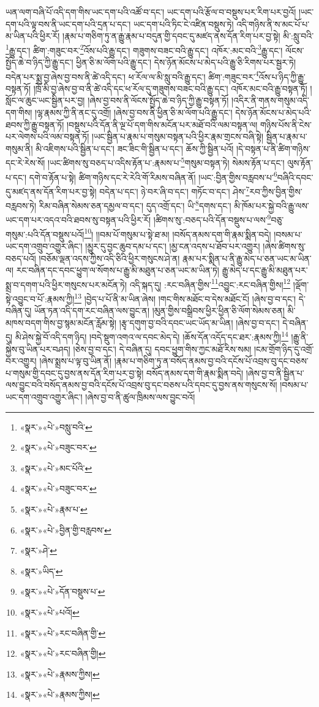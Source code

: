 ཡན་ལག་བཞི་པོ་འདི་དག་གིས་ཡང་དག་པའི་འཚོ་བ་དང་། ཡང་དག་པའི་རྩོལ་བ་བསྡུས་པར་རིག་པར་བྱའོ། །ཡང་དག་པའི་ལྟ་བས་ནི་ཡང་དག་པའི་དྲན་པ་དང་། ཡང་དག་པའི་ཏིང་ངེ་འཛིན་བསྡུས་ཏེ། འདི་གཉིས་ནི་ས་མང་པོ་པ་མ་ཡིན་པའི་ཕྱིར་རོ། །རྣམ་པ་གཅིག་ཏུ་ན་རྒྱུ་རྣམ་པ་བདུན་གྱི་དབང་དུ་མཛད་ནས་དོན་རིག་པར་བྱ་སྟེ། མི་:སླུ་བའི་\footnote{«སྣར་»«པེ་»བསླུ་བའི་}རྒྱུ་དང་། ཚིག་:གཟུང་བར་\footnote{«སྣར་»«པེ་»བཟུང་བར་}འོས་པའི་རྒྱུ་དང་། གཟུགས་བཟང་བའི་རྒྱུ་དང་། འཁོར་:མང་བའི་\footnote{«སྣར་»«པེ་»མང་པོའི་}རྒྱུ་དང་། ལོངས་སྤྱོད་ཆེ་བ་ཉིད་ཀྱི་རྒྱུ་དང་། ཕྱིན་ཅི་མ་ལོག་པའི་རྒྱུ་དང་། དེས་ཉོན་མོངས་པ་མེད་པའི་རྒྱུ་ཅི་རིགས་པར་སྦྱར་ཏེ། བདེན་པར་སྨྲ་བྱ་ཞེས་བྱ་བས་ནི་ཚེ་འདི་དང་། ཕ་རོལ་ལ་མི་སླུ་བའི་རྒྱུ་དང་། ཚིག་:གཟུང་བར་\footnote{«སྣར་»«པེ་»བཟུང་བར་}འོས་པ་ཉིད་ཀྱི་རྒྱུ་བསྟན་ཏོ། །ཁྲོ་མི་བྱ་ཞེས་བྱ་བ་ནི་ཚེ་འདི་དང་ཕ་རོལ་དུ་གཟུགས་བཟང་བའི་རྒྱུ་དང་། འཁོར་མང་བའི་རྒྱུ་བསྟན་ཏོ། །སློང་ལ་ཆུང་ཡང་སྦྱིན་པར་བྱ། །ཞེས་བྱ་བས་ནི་ལོངས་སྤྱོད་ཆེ་བ་ཉིད་ཀྱི་རྒྱུ་བསྟན་ཏོ། །འདིར་ནི་གནས་གསུམ་འདི་དག་གིས། །ལྷ་རྣམས་ཀྱི་ནི་ནང་དུ་འགྲོ། །ཞེས་བྱ་བས་ནི་ཕྱིན་ཅི་མ་ལོག་པའི་རྒྱུ་དང་། དེས་ཉོན་མོངས་པ་མེད་པའི་ཐབས་ཀྱི་རྒྱུ་བསྟན་ཏོ། །བསྡུས་པའི་དོན་ནི་ལྔ་པོ་དག་གིས་མངོན་པར་མཐོ་བའི་ལམ་བསྟན་ལ། གཉིས་པོས་ནི་ངེས་པར་ལེགས་པའི་ལམ་བསྟན་ཏོ། །ཡང་སྦྱིན་པ་རྣམ་པ་གསུམ་བསྟན་པའི་ཕྱིར་རྣམ་གྲངས་བཞི་སྟེ། སྦྱིན་པ་རྣམ་པ་གསུམ་ནི། མི་འཇིགས་པའི་སྦྱིན་པ་དང་། ཟང་ཟིང་གི་སྦྱིན་པ་དང་། ཆོས་ཀྱི་སྦྱིན་པའོ། །དེ་བསྟན་པ་ནི་ཚིག་གཉིས་དང་རེ་རེས་སོ། །ཡང་ཚིགས་སུ་བཅད་པ་འདིས་རྟོན་པ་:རྣམས་པ་\footnote{«སྣར་»«པེ་»རྣམ་པ་}གསུམ་བསྟན་ཏེ། སེམས་རྟོན་པ་དང་། ལུས་རྟོན་པ་དང་། དགེ་བ་རྟོན་པ་སྟེ། ཚིག་གཉིས་དང་རེ་རེའི་གོ་རིམས་བཞིན་ནོ། །ཡང་:བྱིན་གྱིས་བརླབས་པ་\footnote{«སྣར་»«པེ་»བྱིན་གྱི་བརླབས་}བཞིའི་དབང་དུ་མཛད་ནས་དོན་རིག་པར་བྱ་སྟེ། བདེན་པ་དང་། ཉེ་བར་ཞི་བ་དང་། གཏོང་བ་དང་། ཤེས་\footnote{«སྣར་»ཤེ་}རབ་ཀྱིས་བྱིན་གྱིས་བརླབས་ཏེ། རིམ་བཞིན་སེམས་ཅན་དམྱལ་བ་དང་། དུད་འགྲོ་དང་། ཡི་\footnote{«སྣར་»ཡིད་}དགས་དང་། མི་ཁོམ་པར་སྐྱེ་བའི་རྒྱུ་ལས་ཡང་དག་པར་འདའ་བའི་ཐབས་སུ་བསྟན་པའི་ཕྱིར་རོ། །ཚིགས་སུ་:བཅད་པའི་དོན་བསྡུས་པ་ལས་\footnote{«སྣར་»«པེ་»དོན་བསྡུས་པ་}བཅུ་གསུམ་:པའི་དོན་བསྡུས་པའོ།\footnote{«སྣར་»«པེ་»པའོ།}། །།བམ་པོ་གསུམ་པ་སྟེ་ཐ་མ། །བསོད་ནམས་དག་གི་རྣམ་སྨིན་བདེ། །བསམ་པ་ཡང་དག་འགྲུབ་འགྱུར་ཞིང་། །མྱུར་དུ་བྱང་ཆུབ་དམ་པ་དང་། །མྱ་ངན་འདས་པ་ཐོབ་པར་འགྱུར། །ཞེས་ཚིགས་སུ་བཅད་པའོ། །བཅོམ་ལྡན་འདས་ཀྱིས་འདི་ཅིའི་ཕྱིར་གསུངས་ཤེ་ན། རྣམ་པར་སྨིན་པ་ནི་རྒྱུ་མེད་པ་ཅན་ཡང་མ་ཡིན་ལ། རང་བཞིན་དང་དབང་ཕྱུག་ལ་སོགས་པ་རྒྱུ་མི་མཐུན་པ་ཅན་ཡང་མ་ཡིན་ཏེ། རྒྱུ་མེད་པ་དང་རྒྱུ་མི་མཐུན་པར་སྨྲ་བ་དགག་པའི་ཕྱིར་གསུངས་པར་མངོན་ཏེ། འདི་སྐད་དུ། :རང་བཞིན་གྱིས་\footnote{«སྣར་»«པེ་»རང་བཞིན་གྱི་}འབྱུང་:རང་བཞིན་གྱིས།\footnote{«སྣར་»«པེ་»རང་བཞིན་གྱི།} །ལྡོག་སྟེ་འབྱུང་བ་པོ་:རྣམས་ཀྱི།\footnote{«སྣར་»«པེ་»རྣམས་ཀྱིས།} །བྱེད་པ་པོ་ནི་མ་ཡིན་ཞེས། །གང་གིས་མཐོང་བ་དེས་མཐོང་ངོ། །ཞེས་བྱ་བ་དང་། དེ་བཞིན་དུ། ཡོན་ཏན་འདི་དག་རང་བཞིན་ལས་བྱུང་ན། །མུན་གྱིས་བསྒྲིབས་ཕྱིར་ཕྱིན་ཅི་ལོག་སེམས་ཅན། མི་མཁས་བདག་གིས་བྱ་སྙམ་མངོན་རློམ་སྟེ། །རྩྭ་དགུག་བྱ་བའི་དབང་ཡང་ཡོད་མ་ཡིན། །ཞེས་བྱ་བ་དང་། དེ་བཞིན་དུ། མི་ཤེས་སྐྱེ་བོ་འདི་དག་ཉིད། །བདེ་སྡུག་འགའ་ལ་དབང་མེད་དེ། །ཆོས་དོན་འདོད་དང་ཐར་:རྣམས་ཀྱི།\footnote{«སྣར་»«པེ་»རྣམས་ཀྱིས།} །རྒྱུ་ནི་སྐྱེས་བུ་ཡིན་པར་བཤད། །ཅེས་བྱ་བ་དང་། དེ་བཞིན་དུ། དབང་ཕྱུག་གིས་ཀྱང་མཐོ་རིས་སམ། །ངམ་གྲོག་ཉིད་དུ་འགྲོ་བར་འགྱུར། །ཞེས་སྨྲས་པ་ལྟ་བུ་ཡིན་ནོ། །རྣམ་པ་གཅིག་ཏུ་ན་བསོད་ནམས་བྱ་བའི་དངོས་པོ་འབྲས་བུ་དང་བཅས་པ་གསུམ་གྱི་དབང་དུ་བྱས་ནས་དོན་རིག་པར་བྱ་སྟེ། བསོད་ནམས་དག་གི་རྣམ་སྨིན་བདེ། །ཞེས་བྱ་བ་ནི་སྦྱིན་པ་ལས་བྱུང་བའི་བསོད་ནམས་བྱ་བའི་དངོས་པོ་འབྲས་བུ་དང་བཅས་པའི་དབང་དུ་བྱས་ནས་གསུངས་སོ། །བསམ་པ་ཡང་དག་འགྲུབ་འགྱུར་ཞིང་། །ཞེས་བྱ་བ་ནི་ཚུལ་ཁྲིམས་ལས་བྱུང་བའོ། 